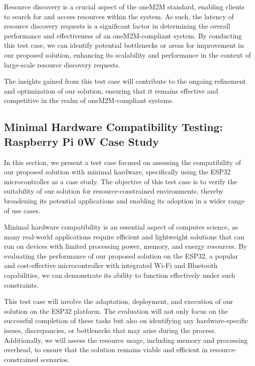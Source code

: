 \documentclass[a4paper,fleqn]{cas-dc}
\begin{document}
Resource discovery is a crucial aspect of the oneM2M standard, enabling clients to search for and access resources within the system. As such, the latency of resource discovery requests is a significant factor in determining the overall performance and effectiveness of an oneM2M-compliant system. By conducting this test case, we can identify potential bottlenecks or areas for improvement in our proposed solution, enhancing its scalability and performance in the context of large-scale resource discovery requests.

The insights gained from this test case will contribute to the ongoing refinement and optimization of our solution, ensuring that it remains effective and competitive in the realm of oneM2M-compliant systems.




\subsection{Minimal Hardware Compatibility Testing: Raspberry Pi 0W Case Study}

In this section, we present a test case focused on assessing the compatibility of our proposed solution with minimal hardware, specifically using the ESP32 microcontroller as a case study. The objective of this test case is to verify the suitability of our solution for resource-constrained environments, thereby broadening its potential applications and enabling its adoption in a wider range of use cases.

Minimal hardware compatibility is an essential aspect of computer science, as many real-world applications require efficient and lightweight solutions that can run on devices with limited processing power, memory, and energy resources. By evaluating the performance of our proposed solution on the ESP32, a popular and cost-effective microcontroller with integrated Wi-Fi and Bluetooth capabilities, we can demonstrate its ability to function effectively under such constraints.

This test case will involve the adaptation, deployment, and execution of our solution on the ESP32 platform. The evaluation will not only focus on the successful completion of these tasks but also on identifying any hardware-specific issues, discrepancies, or bottlenecks that may arise during the process. Additionally, we will assess the resource usage, including memory and processing overhead, to ensure that the solution remains viable and efficient in resource-constrained scenarios.
\end{document}
